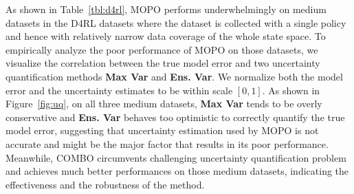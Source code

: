 As shown in Table~\ref{tbl:d4rl}, MOPO performs underwhelmingly on medium datasets in the D4RL datasets where the dataset is collected with a single policy and hence with relatively narrow data coverage of the whole state space. To empirically analyze the poor performance of MOPO on those datasets, we visualize the correlation between the true model error and two uncertainty quantification methods \textbf{Max Var} and \textbf{Ens. Var}. We normalize both the model error and the uncertainty estimates to be within scale $[0, 1]$. As shown in Figure~\ref{fig:uq}, on all three medium datasets, \textbf{Max Var} tends to be overly conservative and \textbf{Ens. Var} behaves too optimistic to correctly quantify the true model error, suggesting that uncertainty estimation used by MOPO is not accurate and might be the major factor that results in its poor performance. Meanwhile, COMBO circumvents challenging uncertainty quantification problem and achieves much better performances on those medium datasets, indicating the effectiveness and the robustness of the method.